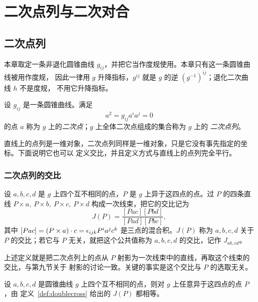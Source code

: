 \chapter{二次点列与二次对合}

\section{二次点列}

本章取定一条非退化圆锥曲线 $g_{ij}$，并把它当作度规使用。本章只有这一条圆锥曲线被用作度规，
因此一律用 $g$ 升降指标，$g^{ij}$ 就是 $g$ 的逆 $(g^{-1})^{ij}$；退化二次曲线 $h$ 不是度规，
不用它升降指标。

\begin{definition}[二次点列]
设 $g_{ij}$ 是一条圆锥曲线。满足
\[
a^2=g_{ij}a^ia^j=0
\]
的点 $a$ 称为 $g$ 上的\emph{二次点}；$g$ 上全体二次点组成的集合称为 $g$ 上的
\emph{二次点列}。
\end{definition}

直线上的点列是一维对象，二次点列同样是一维对象，只是它没有事先指定的坐标。下面说明它也可以
定义交比，并且定义方式与直线上的点列完全平行。

\subsection{二次点列的交比}

\begin{definition}[二次点列的交比]\label{def:doublecross}
设 $a,b,c,d$ 是 $g$ 上四个互不相同的点，$P$ 是 $g$ 上异于这四点的点。过 $P$ 的四条直线
$P\times a,\ P\times b,\ P\times c,\ P\times d$ 构成一次线束，把它的交比记为
\[
J(P)=\frac{[Pac][Pbd]}{[Pad][Pbc]},
\]
其中 $[Pac]=(P\times a)\cdot c=\epsilon_{ijk}P^ia^jc^k$ 是三点的混合积。$J(P)$ 称为
$a,b,c,d$ 关于 $P$ 的交比；若它与 $P$ 无关，就把这个公共值称为 $a,b,c,d$ 的交比，记作
$J_{ab,cd}$。
\end{definition}

上述定义就是把二次点列上的点从 $P$ 射影为一次线束中的直线，再取这个线束的交比，与第九节关于
射影的讨论一致。关键的事实是这个交比与 $P$ 的选取无关。

\begin{theorem}[交比与辅助点无关]\label{thm:doublecross}
设 $a,b,c,d$ 是圆锥曲线 $g$ 上四个互不相同的点，则对 $g$ 上任意异于这四点的点 $P$，由
定义~\ref{def:doublecross} 给出的 $J(P)$ 都相等。
\end{theorem}

